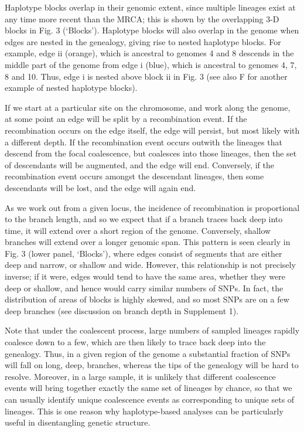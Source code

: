 \documentclass[twocolumn]{bmcart}%
\begin{document}
Haplotype blocks overlap in their genomic extent, since multiple lineages exist at any time more recent than the MRCA; this is shown by the overlapping 3-D blocks in Fig. 3 (‘Blocks’). Haplotype blocks will also overlap in the genome when edges are nested in the genealogy, giving rise to nested haplotype blocks. For example, edge ii (orange), which is ancestral to genomes 4 and 8 descends in the middle part of the genome from edge i (blue), which is ancestral to genomes 4, 7, 8 and 10. Thus, edge i is nested above block ii in Fig. 3 (see also F for another example of nested haplotype blocks). 

If we start at a particular site on the chromosome, and work along the genome, at some point an edge will be split by a recombination event. If the recombination occurs on the edge itself, the edge will persist, but most likely with a different depth. If the recombination event occurs outwith the lineages that descend from the focal coalescence, but coalesces into those lineages, then the set of descendants will be augmented, and the edge will end. Conversely, if the recombination event occurs amongst the descendant lineages, then some descendants will be lost, and the edge will again end. 

As we work out from a given locus, the incidence of recombination is proportional to the branch length, and so we expect that if a branch traces back deep into time, it will extend over a short region of the genome. Conversely, shallow branches will extend over a longer genomic span. This pattern is seen clearly in Fig. 3 (lower panel, ‘Blocks’), where edges consist of segments that are either deep and narrow, or shallow and wide. However, this relationship is not precisely inverse; if it were, edges would tend to have the same area, whether they were deep or shallow, and hence would carry similar numbers of SNPs. In fact, the distribution of areas of blocks is highly skewed, and so most SNPs are on a few deep branches (see discussion on branch depth in Supplement 1).

Note that under the coalescent process, large numbers of sampled lineages rapidly coalesce down to a few, which are then likely to trace back deep into the genealogy. Thus, in a given region of the genome a substantial fraction of SNPs will fall on long, deep, branches, whereas the tips of the genealogy will be hard to resolve. Moreover, in a large sample, it is unlikely that different coalescence events will bring together exactly the same set of lineages by chance, so that we can usually identify unique coalescence events as corresponding to unique sets of lineages. This is one reason why haplotype-based analyses can be particularly useful in disentangling genetic structure.
\end{document}
